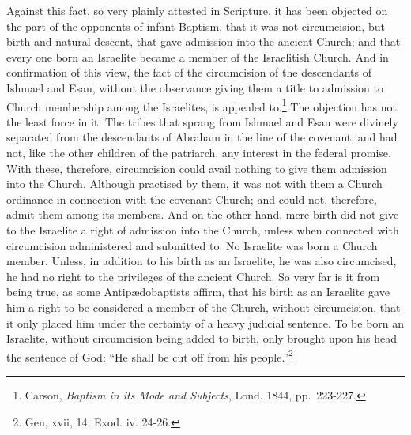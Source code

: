 \documentclass[english,]{book}
\begin{document}
Against this fact, so very plainly attested in Scripture, it has been objected on the part of the opponents of infant Baptism, that it was not circumcision, but birth and natural descent, that gave admission into the ancient Church; and that every one born an Israelite became a member of the Israelitish Church. And in confirmation of this view, the fact of the circumcision of the descendants of Ishmael and Esau, without the observance giving them a title to admission to Church membership among the Israelites, is appealed to.\footnote{Carson, \emph{Baptism in its Mode and Subjects}, Lond. 1844, pp.~223-227.} The objection has not the least force in it. The tribes that sprang from Ishmael and Esau were divinely separated from the descendants of Abraham in the line of the covenant; and had not, like the other children of the patriarch, any interest in the federal promise. With these, therefore, circumcision could avail nothing to give them admission into the Church. Although practised by them, it was not with them a Church ordinance in connection with the covenant Church; and could not, therefore, admit them among its members. And on the other hand, mere birth did not give to the Israelite a right of admission into the Church, unless when connected with circumcision administered and submitted to. No Israelite was born a Church member. Unless, in addition to his birth as an Israelite, he was also circumcised, he had no right to the privileges of the ancient Church. So very far is it from being true, as some Antipædobaptists affirm, that his birth as an Israelite gave him a right to be considered a member of the Church, without circumcision, that it only placed him under the certainty of a heavy judicial sentence. To be born an Israelite, without circumcision being added to birth, only brought upon his head the sentence of God: ``He shall be cut off from his people.''\footnote{Gen, xvii, 14; Exod. iv. 24-26.}
\end{document}
